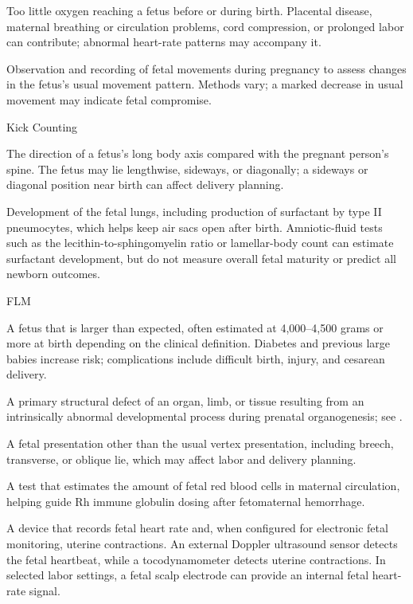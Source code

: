  Too little oxygen reaching a fetus before or during birth. Placental disease, maternal breathing or circulation problems, cord compression, or prolonged labor can contribute; abnormal heart-rate patterns may accompany it.

 Observation and recording of fetal movements during pregnancy to assess changes in the fetus’s usual movement pattern. Methods vary; a marked decrease in usual movement may indicate fetal compromise.

\synonyms
Kick Counting

 The direction of a fetus’s long body axis compared with the pregnant person’s spine. The fetus may lie lengthwise, sideways, or diagonally; a sideways or diagonal position near birth can affect delivery planning.

 Development of the fetal lungs, including production of surfactant by type II pneumocytes, which helps keep air sacs open after birth. Amniotic-fluid tests such as the lecithin-to-sphingomyelin ratio or lamellar-body count can estimate surfactant development, but do not measure overall fetal maturity or predict all newborn outcomes.

\synonyms
FLM

 A fetus that is larger than expected, often estimated at 4,000–4,500 grams or more at birth depending on the clinical definition. Diabetes and previous large babies increase risk; complications include difficult birth, injury, and cesarean delivery.

 A primary structural defect of an organ, limb, or tissue resulting from an intrinsically abnormal developmental process during prenatal organogenesis; see .

 A fetal presentation other than the usual vertex presentation, including breech, transverse, or oblique lie, which may affect labor and delivery planning.

 A test that estimates the amount of fetal red blood cells in maternal circulation, helping guide Rh immune globulin dosing after fetomaternal hemorrhage.

 A device that records fetal heart rate and, when configured for electronic fetal monitoring, uterine contractions. An external Doppler ultrasound sensor detects the fetal heartbeat, while a tocodynamometer detects uterine contractions. In selected labor settings, a fetal scalp electrode can provide an internal fetal heart-rate signal.

